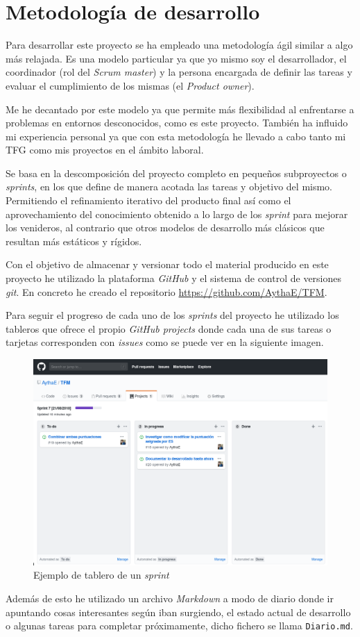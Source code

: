 \section{Metodología de desarrollo}
\label{sc:metodologia}
Para desarrollar este proyecto se ha empleado una metodología ágil similar a \textit{}  algo más relajada. Es una modelo particular ya que yo mismo soy el desarrollador, el coordinador (rol del \textit{Scrum master}) y la persona encargada de definir las tareas y evaluar el cumplimiento de los mismas (el \textit{Product owner}).

Me he decantado por este modelo ya que permite más flexibilidad al enfrentarse a problemas en entornos desconocidos, como es este proyecto. También ha influido mi experiencia personal ya que con esta metodología he llevado a cabo tanto mi \acrshort{TFG} como mis proyectos en el ámbito laboral. 

Se basa en la descomposición del proyecto completo en pequeños subproyectos o \textit{sprints}, en los que define de manera acotada las tareas y objetivo del mismo. Permitiendo el refinamiento iterativo del producto final así como el aprovechamiento del conocimiento obtenido a lo largo de los \textit{sprint} para mejorar los venideros, al contrario que otros modelos de desarrollo más clásicos que resultan más estáticos y rígidos.

Con el objetivo de almacenar y versionar todo el material producido en este proyecto he utilizado la plataforma \textit{GitHub} y el sistema de control de versiones \textit{git}. En concreto he creado el repositorio \url{https://github.com/AythaE/TFM}.

Para seguir el progreso de cada uno de los \textit{sprints} del proyecto he utilizado los tableros que ofrece el propio \textit{GitHub projects} donde cada una de sus tareas o tarjetas corresponden con \textit{issues} como se puede ver en la siguiente imagen. 

\begin{figure}[h]
	
	\centering
	\includegraphics[width=\linewidth]{imagenes/ejemplo_tablero_sprint}
	\caption{Ejemplo de tablero de un \textit{sprint}}
	\label{fig:tableroSprint}
\end{figure}

Además de esto he utilizado un archivo \textit{Markdown} a modo de diario donde ir apuntando cosas interesantes según iban surgiendo, el estado actual de desarrollo o algunas tareas para completar próximamente, dicho fichero se llama \texttt{Diario.md}.
